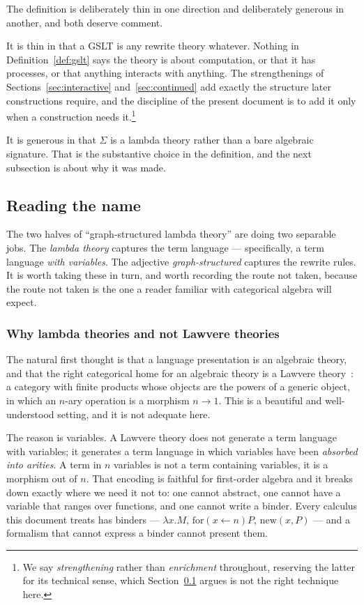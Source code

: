 \documentclass[11pt]{article}
\theoremstyle{definition}
\theoremstyle{plain}
\theoremstyle{remark}
\begin{document}
The definition is deliberately thin in one direction and deliberately generous in
another, and both deserve comment.

It is thin in that a GSLT is any rewrite theory whatever. Nothing in
Definition~\ref{def:gslt} says the theory is about computation, or that it has processes,
or that anything interacts with anything. The strengthenings of
Sections~\ref{sec:interactive} and~\ref{sec:continued} add exactly the structure later
constructions require, and the discipline of the present document is to add it only when
a construction needs it.\footnote{We say \emph{strengthening} rather than
\emph{enrichment} throughout, reserving the latter for its technical sense, which
Section~\ref{subsec:name} argues is not the right technique here.}

It is generous in that $\Sigma$ is a lambda theory rather than a bare algebraic
signature. That is the substantive choice in the definition, and the next subsection is
about why it was made.

\subsection{Reading the name}
\label{subsec:name}

The two halves of ``graph-structured lambda theory'' are doing two separable jobs. The
\emph{lambda theory} captures the term language --- specifically, a term language
\emph{with variables}. The adjective \emph{graph-structured} captures the rewrite rules.
It is worth taking these in turn, and worth recording the route not taken, because the
route not taken is the one a reader familiar with categorical algebra will expect.

\subsubsection{Why lambda theories and not Lawvere theories}

The natural first thought is that a language presentation is an algebraic theory, and
that the right categorical home for an algebraic theory is a Lawvere
theory~\cite{Lawvere1963}: a category with finite products whose objects are the powers
of a generic object, in which an $n$-ary operation is a morphism $n \to 1$. This is a
beautiful and well-understood setting, and it is not adequate here.

The reason is variables. A Lawvere theory does not generate a term language with
variables; it generates a term language in which variables have been \emph{absorbed into
arities}. A term in $n$ variables is not a term containing variables, it is a morphism
out of $n$. That encoding is faithful for first-order algebra and it breaks down exactly
where we need it not to: one cannot abstract, one cannot have a variable that ranges over
functions, and one cannot write a binder. Every calculus this document treats has
binders --- $\lambda x.M$, $\mathrm{for}(x \leftarrow n)P$, $\mathrm{new}(x, P)$ --- and
a formalism that cannot express a binder cannot present them.
\end{document}
